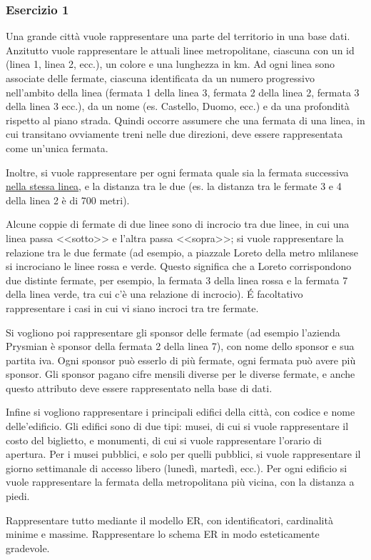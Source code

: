\documentclass[a4paper]{article}
\begin{document}
\subsubsection{Esercizio 1}
Una grande città vuole rappresentare una parte del territorio in una base dati. Anzitutto vuole rappresentare le attuali linee metropolitane, ciascuna con un id (linea 1, linea 2, ecc.), un colore e una lunghezza in km. Ad ogni linea sono associate delle fermate, ciascuna identificata da un numero progressivo nell'ambito della linea (fermata 1 della linea 3, fermata 2 della linea 2, fermata 3 della linea 3 ecc.), da un nome (es. Castello, Duomo, ecc.) e da una profondità rispetto al piano strada. Quindi occorre assumere che una fermata di una linea, in cui transitano ovviamente treni nelle due direzioni, deve essere rappresentata come un'unica fermata.\par Inoltre, si vuole rappresentare per ogni fermata quale sia la fermata successiva \underline{nella stessa linea}, e la distanza tra le due (es. la distanza tra le fermate 3 e 4 della linea 2 è di 700 metri).\par Alcune coppie di fermate di due linee sono di incrocio tra due linee, in cui una linea passa <<sotto>> e l'altra passa <<sopra>>; si vuole rappresentare la relazione tra le due fermate (ad esempio, a piazzale Loreto della metro mlilanese si incrociano le linee rossa e verde. Questo significa che a Loreto corrispondono due distinte fermate, per esempio, la fermata 3 della linea rossa e la fermata 7 della linea verde, tra cui c'è una relazione di incrocio).
É facoltativo rappresentare i casi in cui vi siano incroci tra tre fermate.\par Si vogliono poi rappresentare gli sponsor delle fermate (ad esempio l'azienda Prysmian è sponsor della fermata 2 della linea 7), con nome dello sponsor e sua partita iva. Ogni sponsor può esserlo di più fermate, ogni fermata può avere più sponsor. Gli sponsor pagano cifre mensili diverse per le diverse fermate, e anche questo attributo deve essere rappresentato nella base di dati.\par Infine si vogliono rappresentare i principali edifici della città, con codice e nome delle'edificio. Gli edifici sono di due tipi: musei, di cui si vuole rappresentare il costo del biglietto, e monumenti, di cui si vuole rappresentare l'orario di apertura. Per i musei pubblici, e solo per quelli pubblici, si vuole rappresentare il giorno settimanale di accesso libero (lunedì, martedì, ecc.). Per ogni edificio si vuole rappresentare la fermata della metropolitana più vicina, con la distanza a piedi.\medskip\medskip\\\par Rappresentare tutto mediante il modello ER, con identificatori, cardinalità minime e massime. Rappresentare lo schema ER in modo esteticamente gradevole.
\end{document}

